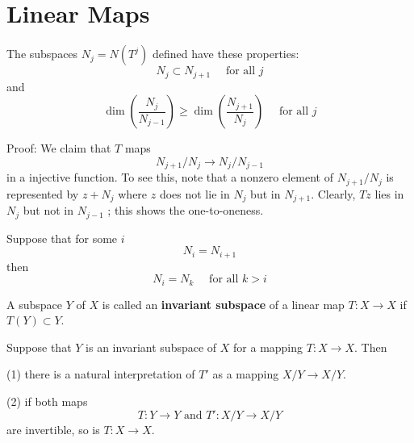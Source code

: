 \documentclass[12pt, oneside]{book}
\begin{document}
\section{Linear Maps}
\begin{theorem}
    The subspaces $N_j=N(T^j)$ defined have these properties:
    \begin{equation*}
        N_j \subset N_{j+1} \quad \text { for all } j
    \end{equation*}
    and
    \begin{equation*}
        \dim\left(\frac{N_j}{N_{j-1}}\right)
        \geq
        \dim\left(\frac{N_{j+1}}{N_j}\right) \quad \text { for all } j
    \end{equation*}

    Proof:
    We claim that $T$ maps
    \begin{equation*}
        N_{j+1} / N_j \rightarrow N_j / N_{j-1}
    \end{equation*}
    in a injective function. To see this, note that a nonzero element of $N_{j+1} / N_j$ is represented by  $z + N_{j}$ where $z$ does not lie in $N_j$ but in $N_{j+1}$. Clearly,
    $T z$
    lies in $N_j$ but not in
    $N_{j-1}$
    ; this shows the one-to-oneness.
\end{theorem}
\begin{corollary}
    Suppose that for some $i$
    \begin{equation*}
        N_i=N_{i+1}
    \end{equation*}
    then
    \begin{equation*}
        N_i=N_k \quad \text { for all } k>i
    \end{equation*}
\end{corollary}

\begin{definition}
    A subspace $Y$ of $X$ is called an \textbf{invariant subspace} of a linear map $T: X \rightarrow X$ if
    $T\left(Y\right) \subset Y$.
\end{definition}


\begin{theorem}
    Suppose that $Y$ is an invariant subspace of $X$ for a mapping $T: X \rightarrow X$. Then

    (1) there is a natural interpretation of $T'$ as a mapping $X / Y \rightarrow X / Y$.

    (2) if both maps
    \begin{equation*}
        T: Y \longrightarrow Y \text { and } T': X / Y \longrightarrow X / Y
    \end{equation*}
    are invertible, so is $T: X \rightarrow X$.
\end{theorem}
\end{document}
